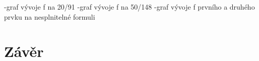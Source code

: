 \documentclass[a4paper]{article}
\begin{document}
	-graf vývoje f na 20/91
	-graf vývoje f na 50/148
	-graf vývoje f prvního a druhého prvku na nesplnitelné formuli

	
\section{Závěr}
\end{document}

